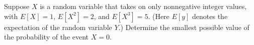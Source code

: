 Suppose $X$ is a random variable that takes on only nonnegative integer values,
with $E\left[ X \right] = 1$, $E\left[ X^2 \right] = 2$, and $E \left[ X^3 \right] = 5$.
(Here $E\left[ y \right]$ denotes the expectation of the random variable $Y$.)
Determine the smallest possible value of the probability of the event $X=0$.
